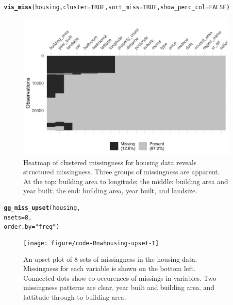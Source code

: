 \documentclass{article}\usepackage[]{graphicx}\usepackage[]{xcolor}
\makeatletter
\newcommand{\hlnum}[1]{\textcolor[rgb]{0.686,0.059,0.569}{#1}}%
\newcommand{\hlstr}[1]{\textcolor[rgb]{0.192,0.494,0.8}{#1}}%
\newcommand{\hlstd}[1]{\textcolor[rgb]{0.345,0.345,0.345}{#1}}%
\newcommand{\hlkwc}[1]{\textcolor[rgb]{0.333,0.667,0.333}{#1}}%
\newcommand{\hlkwd}[1]{\textcolor[rgb]{0.737,0.353,0.396}{\textbf{#1}}}%
\newenvironment{kframe}{%
 \def\at@end@of@kframe{}%
 \ifinner\ifhmode%
  \def\at@end@of@kframe{\end{minipage}}%
  \begin{minipage}{\columnwidth}%
 \fi\fi%
 \def\FrameCommand##1{\hskip\@totalleftmargin \hskip-\fboxsep
 \colorbox{shadecolor}{##1}\hskip-\fboxsep
     \hskip-\linewidth \hskip-\@totalleftmargin \hskip\columnwidth}%
 \MakeFramed {\advance\hsize-\width
   \@totalleftmargin\z@ \linewidth\hsize
   \@setminipage}}%
 {\par\unskip\endMakeFramed%
 \at@end@of@kframe}
\newenvironment{knitrout}{}{} %
\makeatother
\begin{document}
\begin{knitrout}
\color{fgcolor}\begin{kframe}
\begin{alltt}
\hlkwd{vis_miss}\hlstd{(housing,} \hlkwc{cluster} \hlstd{=} \hlnum{TRUE}\hlstd{,} \hlkwc{sort_miss} \hlstd{=} \hlnum{TRUE}\hlstd{,} \hlkwc{show_perc_col} \hlstd{=} \hlnum{FALSE}\hlstd{)}
\end{alltt}
\end{kframe}\begin{figure}

{\centering \includegraphics[width=0.85\linewidth]{figure/code-Rnwapplic-vis-miss-1} 

}

\caption[Heatmap of clustered missingness for housing data reveals structured missingness]{Heatmap of clustered missingness for housing data reveals structured missingness. Three groups of missingness are apparent. At the top: building area to longitude; the middle: building area and year built; the end: building area, year built, and landsize.}\label{fig:applic-vis-miss}
\end{figure}

\end{knitrout}
\begin{knitrout}
\color{fgcolor}\begin{kframe}
\begin{alltt}
\hlkwd{gg_miss_upset}\hlstd{(housing,}
              \hlkwc{nsets} \hlstd{=} \hlnum{8}\hlstd{,}
              \hlkwc{order.by} \hlstd{=} \hlstr{"freq"}\hlstd{)}
\end{alltt}
\end{kframe}\begin{figure}

{\centering \texttt{[image: figure/code-Rnwhousing-upset-1]} 

}

\caption[An upset plot of 8 sets of missingness in the housing data]{An upset plot of 8 sets of missingness in the housing data. Missingness for each variable is shown on the bottom left. Connected dots show co-occurences of missings in variables. Two missingness patterns are clear, year built and building area, and lattitude through to building area.}\label{fig:housing-upset}
\end{figure}

\end{knitrout}
\end{document}
